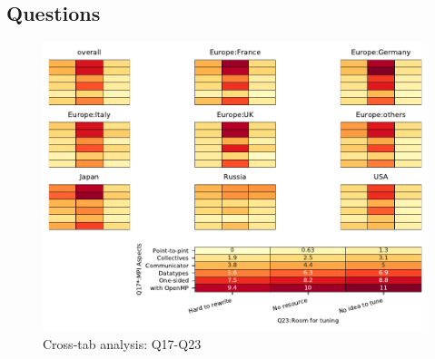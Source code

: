 
\subsection{Questions}


\begin{figure}
\begin{center}
\includegraphics[width=12cm]{../pdfs/Q17-Q23.pdf}
\caption{Cross-tab analysis: Q17-Q23}
\label{fig:Q17-Q23}
\end{center}
\end{figure}

